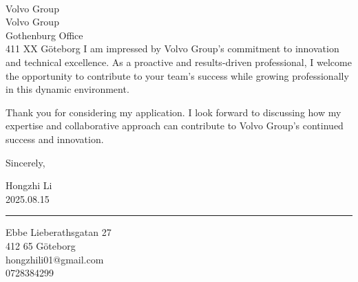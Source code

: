 \documentclass[a4paper,10pt]{article}
\begin{document}
\begin{letter}{\color{darkblue}\\
Volvo Group\\
Volvo Group\\Gothenburg Office\\
411 XX Göteborg}
I am impressed by Volvo Group's commitment to innovation and technical excellence. As a proactive and results-driven professional, I welcome the opportunity to contribute to your team's success while growing professionally in this dynamic environment.

Thank you for considering my application. I look forward to discussing how my expertise and collaborative approach can contribute to Volvo Group's continued success and innovation.

\vspace{20pt}

Sincerely,

Hongzhi Li\\
2025.08.15

\vspace{40pt}

{\color{darkblue}\rule{\linewidth}{0.6pt}}

\vspace{4pt}

\closing{\color{darkblue} 
Ebbe Lieberathsgatan 27\\
412 65 Göteborg\\
hongzhili01@gmail.com\\
0728384299}

\\
\vspace{10pt}

\end{letter}
\end{document}
